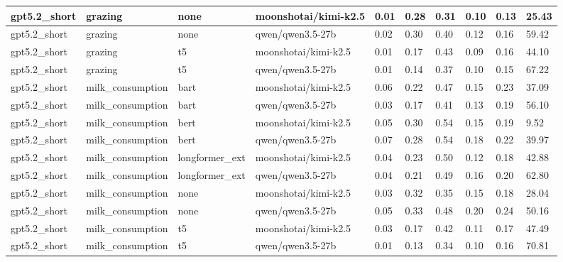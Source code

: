 \begin{tabular}{|l|l|l|l|l|l|l|l|l|l|}
 \hline
 gpt5.2\_short & grazing & none & moonshotai/kimi-k2.5 & 0.01 & 0.28 & 0.31 & 0.10 & 0.13 & 25.43 \\
 \hline
 gpt5.2\_short & grazing & none & qwen/qwen3.5-27b & 0.02 & 0.30 & 0.40 & 0.12 & 0.16 & 59.42 \\
 \hline
 gpt5.2\_short & grazing & t5 & moonshotai/kimi-k2.5 & 0.01 & 0.17 & 0.43 & 0.09 & 0.16 & 44.10 \\
 \hline
 gpt5.2\_short & grazing & t5 & qwen/qwen3.5-27b & 0.01 & 0.14 & 0.37 & 0.10 & 0.15 & 67.22 \\
 \hline
 gpt5.2\_short & milk\_consumption & bart & moonshotai/kimi-k2.5 & 0.06 & 0.22 & 0.47 & 0.15 & 0.23 & 37.09 \\
 \hline
 gpt5.2\_short & milk\_consumption & bart & qwen/qwen3.5-27b & 0.03 & 0.17 & 0.41 & 0.13 & 0.19 & 56.10 \\
 \hline
 gpt5.2\_short & milk\_consumption & bert & moonshotai/kimi-k2.5 & 0.05 & 0.30 & 0.54 & 0.15 & 0.19 & 9.52 \\
 \hline
 gpt5.2\_short & milk\_consumption & bert & qwen/qwen3.5-27b & 0.07 & 0.28 & 0.54 & 0.18 & 0.22 & 39.97 \\
 \hline
 gpt5.2\_short & milk\_consumption & longformer\_ext & moonshotai/kimi-k2.5 & 0.04 & 0.23 & 0.50 & 0.12 & 0.18 & 42.88 \\
 \hline
 gpt5.2\_short & milk\_consumption & longformer\_ext & qwen/qwen3.5-27b & 0.04 & 0.21 & 0.49 & 0.16 & 0.20 & 62.80 \\
 \hline
 gpt5.2\_short & milk\_consumption & none & moonshotai/kimi-k2.5 & 0.03 & 0.32 & 0.35 & 0.15 & 0.18 & 28.04 \\
 \hline
 gpt5.2\_short & milk\_consumption & none & qwen/qwen3.5-27b & 0.05 & 0.33 & 0.48 & 0.20 & 0.24 & 50.16 \\
 \hline
 gpt5.2\_short & milk\_consumption & t5 & moonshotai/kimi-k2.5 & 0.03 & 0.17 & 0.42 & 0.11 & 0.17 & 47.49 \\
 \hline
 gpt5.2\_short & milk\_consumption & t5 & qwen/qwen3.5-27b & 0.01 & 0.13 & 0.34 & 0.10 & 0.16 & 70.81 \\
\hline
\end{tabular}

